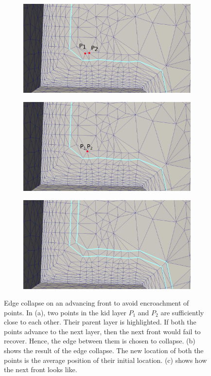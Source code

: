 \begin{figure}[hbt!]
\centering
\begin{subfigure}{.5\textwidth}
  \centering
  \includegraphics[width=.9\linewidth]{img/m2/edge-collapse/collapse1.eps}
  \caption{}
  \label{collapse1}
\end{subfigure}%
\begin{subfigure}{.5\textwidth}
  \centering
  \includegraphics[width=.9\linewidth]{img/m2/edge-collapse/collapse2.eps}
  \caption{}
  \label{collapse2}
\end{subfigure}
\begin{subfigure}{.5\textwidth}
  \centering
  \includegraphics[width=.9\linewidth]{img/m2/edge-collapse/collapse3.eps}
  \caption{}
  \label{collapse3}
\end{subfigure}
\caption{Edge collapse on an advancing front to avoid encroachment of points. In (a), two points in the kid layer $P_1$ and $P_2$ are sufficiently close to each other. Their parent layer is highlighted. If both the points advance to the next layer, then the next front would fail to recover. Hence, the edge between them is chosen to collapse. (b) shows the result of the edge collapse. The new location of both the points is the average position of their initial location. (c) shows how the next front looks like.}
\label{edge-collapse}
\end{figure}


